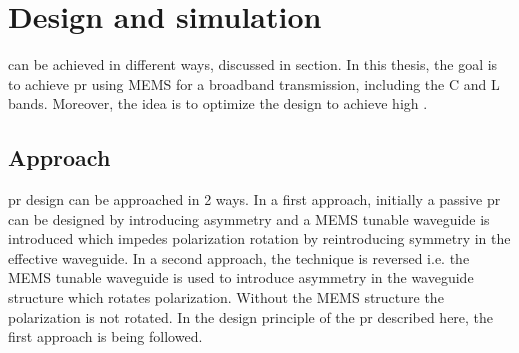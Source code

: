 \documentclass[../report.tex]{subfiles}
\begin{document}
	

\chapter{Design and simulation}
 can be achieved in different ways, discussed in section. In this thesis, the goal is to achieve \gls{pr} using MEMS for a broadband transmission, including the C and L bands. Moreover, the idea is to optimize the design to achieve high .  
	
	\section{Approach}
 \gls{pr} design can be approached in 2 ways. In a first approach, initially a passive \gls{pr} can be designed by introducing asymmetry and a MEMS tunable waveguide is introduced which impedes polarization rotation by reintroducing symmetry in the effective waveguide. In a second approach, the technique is reversed i.e. the MEMS tunable waveguide is used to introduce asymmetry in the waveguide structure which rotates polarization. Without the MEMS structure the polarization is not rotated. In the design principle of the \gls{pr} described here, the first approach is being followed.  
\end{document}

